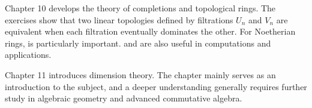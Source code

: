 Chapter 10 develops the theory of completions and topological rings. The exercises show that two linear topologies defined by filtrations $U_n$ and $V_n$ are equivalent when each filtration eventually dominates the other. For Noetherian rings,  is particularly important.  and  are also useful in computations and applications.
\vspace{10pt}

Chapter 11 introduces dimension theory. The chapter mainly serves as an introduction to the subject, and a deeper understanding generally requires further study in algebraic geometry and advanced commutative algebra.